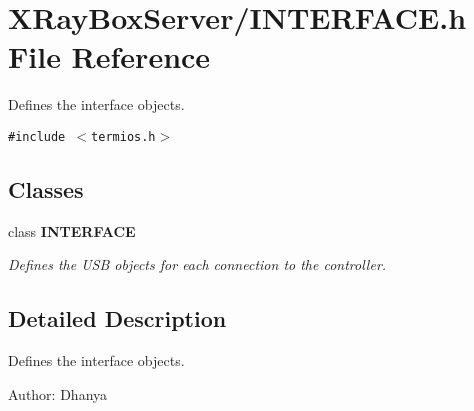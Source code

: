\section{XRay\-Box\-Server/INTERFACE.h File Reference}
\label{INTERFACE_8h}
Defines the interface objects. 

{\tt \#include $<$termios.h$>$}\par
\subsection*{Classes}
\begin{CompactItemize}
\item 
class \bf{INTERFACE}
\begin{CompactList}\small\item\em Defines the USB objects for each connection to the controller. \item\end{CompactList}\end{CompactItemize}


\subsection{Detailed Description}
Defines the interface objects. 

\begin{Desc}
\item[Author:]Dhanya \end{Desc}
